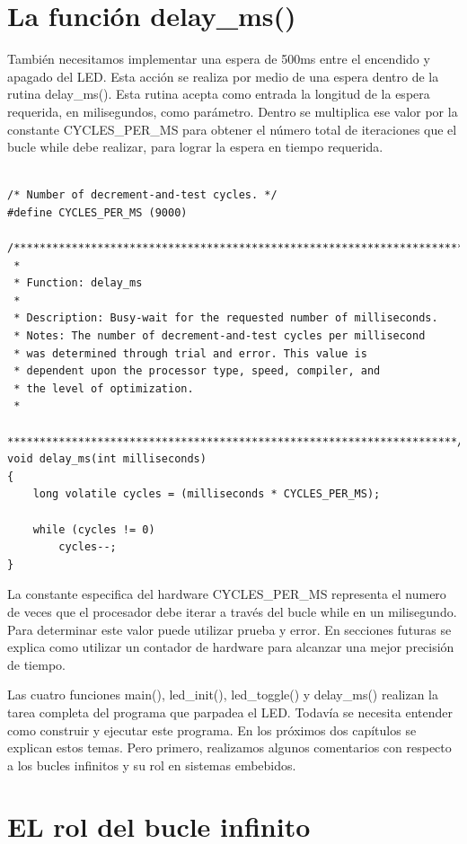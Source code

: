 \documentclass[output=paper, 
colorlinks,
citecolor=brown,
newtxmath
]{langscibook}
\begin{document}
\section {La función delay\_ms()}

También necesitamos implementar una espera de 500ms entre el encendido y apagado
del LED. Esta acción se realiza por medio de una espera dentro de la rutina
delay\_ms().
Esta rutina acepta como entrada la longitud de la espera requerida, en milisegundos, como parámetro. Dentro se multiplica ese valor por la constante
CYCLES\_PER\_MS para obtener el número total de iteraciones que el bucle
while debe realizar, para lograr la espera en tiempo requerida.


\begin{verbatim}

/* Number of decrement-and-test cycles. */
#define CYCLES_PER_MS (9000)

/**********************************************************************
 *
 * Function: delay_ms
 *
 * Description: Busy-wait for the requested number of milliseconds.
 * Notes: The number of decrement-and-test cycles per millisecond
 * was determined through trial and error. This value is
 * dependent upon the processor type, speed, compiler, and
 * the level of optimization.  
 *
 **********************************************************************/
void delay_ms(int milliseconds)
{
    long volatile cycles = (milliseconds * CYCLES_PER_MS);

    while (cycles != 0)
        cycles--;
}
\end{verbatim}

La constante especifica del hardware CYCLES\_PER\_MS representa el numero
de veces que el procesador debe iterar a través del bucle while en un milisegundo.
Para determinar este valor puede utilizar prueba y error.
En secciones futuras se explica como utilizar un contador de hardware para
alcanzar una mejor precisión de tiempo. 

Las cuatro funciones main(), led\_init(), led\_toggle() y delay\_ms() realizan la tarea completa del programa que parpadea el LED. Todavía se necesita entender como construir y ejecutar este programa. En los próximos dos capítulos se explican estos temas.
Pero primero, realizamos algunos comentarios con respecto a los bucles infinitos y su rol en sistemas embebidos.

\section {EL rol del bucle infinito}
\end{document}

